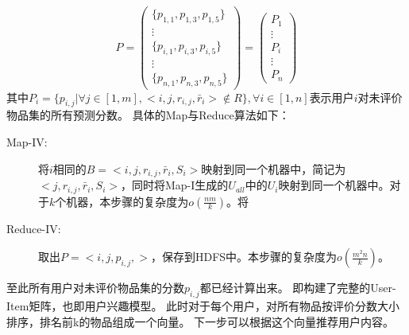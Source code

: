 \begin{equation}
P=\left(
\begin{array}{c}
 \{ p_{1,1},p_{1,3},p_{1,5} \} \\
\vdots \\
\{ p_{i,1},p_{i,3},p_{i,5} \} \\
\vdots \\
\{p_{n,1},p_{n,3},p_{n,5}\}
\end{array}
\right) = \left(
\begin{array}{c}
P_1 \\
\vdots\\
P_i\\
\vdots \\
P_n
\end{array}
\right)
\end{equation}
其中$P_i=\{p_{i,j}|\forall j\in [1,m],<i,j,r_{i,j},\bar{r}_i>\notin R\},\forall i\in[1,n]$表示用户$i$对未评价物品集的所有预测分数。
具体的Map与Reduce算法如下：
\begin{description}
\item[Map-IV:] 将$i$相同的$B=<i,j,r_{i,j},\bar{r}_i ,S_i>$映射到同一个机器中，简记为$<j,r_{i,j},\bar{r}_i ,S_i>$，同时将Map-I生成的$U_{all}$中的$U_i$映射到同一个机器中。对于$k$个机器，本步骤的复杂度为$o(\frac{nm}{k})$。将
\item[Reduce-IV:] 取出$P=<i,j,p_{i,j},>$，保存到HDFS中。本步骤的复杂度为$o(\frac{m^2n}{k})$。
\end{description}
至此所有用户对未评价物品集的分数$p_{i,j}$都已经计算出来。
即构建了完整的User-Item矩阵，也即用户兴趣模型。
此时对于每个用户，对所有物品按评价分数大小排序，排名前k的物品组成一个向量。
下一步可以根据这个向量推荐用户内容。






